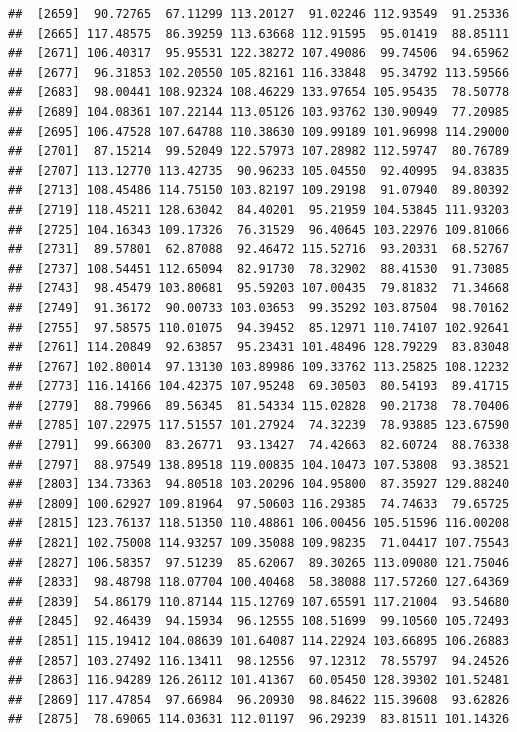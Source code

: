 \documentclass[
]{article}
\begin{document}
\begin{verbatim}
##  [2659]  90.72765  67.11299 113.20127  91.02246 112.93549  91.25336
##  [2665] 117.48575  86.39259 113.63668 112.91595  95.01419  88.85111
##  [2671] 106.40317  95.95531 122.38272 107.49086  99.74506  94.65962
##  [2677]  96.31853 102.20550 105.82161 116.33848  95.34792 113.59566
##  [2683]  98.00441 108.92324 108.46229 133.97654 105.95435  78.50778
##  [2689] 104.08361 107.22144 113.05126 103.93762 130.90949  77.20985
##  [2695] 106.47528 107.64788 110.38630 109.99189 101.96998 114.29000
##  [2701]  87.15214  99.52049 122.57973 107.28982 112.59747  80.76789
##  [2707] 113.12770 113.42735  90.96233 105.04550  92.40995  94.83835
##  [2713] 108.45486 114.75150 103.82197 109.29198  91.07940  89.80392
##  [2719] 118.45211 128.63042  84.40201  95.21959 104.53845 111.93203
##  [2725] 104.16343 109.17326  76.31529  96.40645 103.22976 109.81066
##  [2731]  89.57801  62.87088  92.46472 115.52716  93.20331  68.52767
##  [2737] 108.54451 112.65094  82.91730  78.32902  88.41530  91.73085
##  [2743]  98.45479 103.80681  95.59203 107.00435  79.81832  71.34668
##  [2749]  91.36172  90.00733 103.03653  99.35292 103.87504  98.70162
##  [2755]  97.58575 110.01075  94.39452  85.12971 110.74107 102.92641
##  [2761] 114.20849  92.63857  95.23431 101.48496 128.79229  83.83048
##  [2767] 102.80014  97.13130 103.89986 109.33762 113.25825 108.12232
##  [2773] 116.14166 104.42375 107.95248  69.30503  80.54193  89.41715
##  [2779]  88.79966  89.56345  81.54334 115.02828  90.21738  78.70406
##  [2785] 107.22975 117.51557 101.27924  74.32239  78.93885 123.67590
##  [2791]  99.66300  83.26771  93.13427  74.42663  82.60724  88.76338
##  [2797]  88.97549 138.89518 119.00835 104.10473 107.53808  93.38521
##  [2803] 134.73363  94.80518 103.20296 104.95800  87.35927 129.88240
##  [2809] 100.62927 109.81964  97.50603 116.29385  74.74633  79.65725
##  [2815] 123.76137 118.51350 110.48861 106.00456 105.51596 116.00208
##  [2821] 102.75008 114.93257 109.35088 109.98235  71.04417 107.75543
##  [2827] 106.58357  97.51239  85.62067  89.30265 113.09080 121.75046
##  [2833]  98.48798 118.07704 100.40468  58.38088 117.57260 127.64369
##  [2839]  54.86179 110.87144 115.12769 107.65591 117.21004  93.54680
##  [2845]  92.46439  94.15934  96.12555 108.51699  99.10560 105.72493
##  [2851] 115.19412 104.08639 101.64087 114.22924 103.66895 106.26883
##  [2857] 103.27492 116.13411  98.12556  97.12312  78.55797  94.24526
##  [2863] 116.94289 126.26112 101.41367  60.05450 128.39302 101.52481
##  [2869] 117.47854  97.66984  96.20930  98.84622 115.39608  93.62826
##  [2875]  78.69065 114.03631 112.01197  96.29239  83.81511 101.14326

\end{verbatim}
\end{document}
